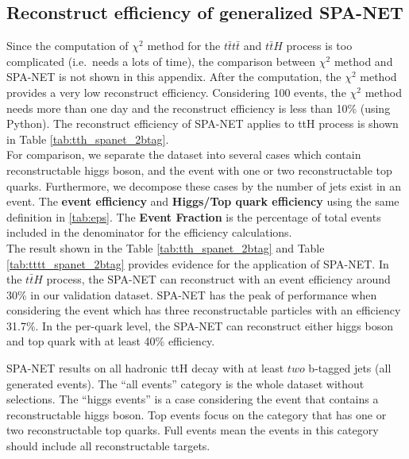 \subsection{Reconstruct efficiency of generalized SPA-NET}\label{appendix_subsec: reco eff}
Since the computation of $\chi^{2}$ method for the $t\bar{t}t\bar{t}$ and $t\bar{t}H$ process is too complicated (i.e.~needs a lots of time), the comparison between $\chi^{2}$ method and SPA-NET is not shown in this appendix. After the computation, the $\chi^{2}$ method provides a very low reconstruct efficiency. Considering 100 events, the $\chi^{2}$ method needs more than one day and the reconstruct efficiency is less than 10\% (using Python). The reconstruct efficiency of SPA-NET applies to ttH process is shown in Table \ref{tab:tth_spanet_2btag}.
\\
For comparison, we separate the dataset into several cases which contain reconstructable higgs boson, and the event with one or two reconstructable top quarks. Furthermore, we decompose these cases by the number of jets exist in an event. The  \textbf{event efficiency} and  \textbf{Higgs/Top quark efficiency} using the same definition in \ref{tab:eps}.  The \textbf{Event Fraction} is the percentage of total events included in the denominator for the efficiency calculations.
\\
The result shown in the Table \ref{tab:tth_spanet_2btag} and Table \ref{tab:tttt_spanet_2btag} provides evidence for the application of SPA-NET. In the $t\bar{t}H$ process, the SPA-NET can reconstruct with an event efficiency around 30\% in our validation dataset. SPA-NET has the peak of performance when considering the event which has three reconstructable particles with an efficiency 31.7\%. In the per-quark level, the SPA-NET can reconstruct either higgs boson and top quark with at least 40\% efficiency. 
\\
\begin{table}[H]
	\resizebox{13cm}{!}{
		    
	}
	\vspace{0.1cm}
	\caption{SPA-NET results on all hadronic ttH decay with at least $two$ b-tagged jets (all generated events). The ``all events'' category is the whole dataset without selections. The ``higgs events'' is a case considering the event that contains a reconstructable higgs boson. Top events focus on the category that has one or two reconstructable top quarks. Full events mean the events in this category should include all reconstructable targets.}
	\label{tab:tth_spanet_2btag}
\end{table}
